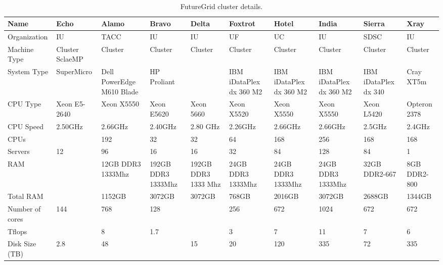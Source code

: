 
\begin{sidewaystable}

\caption{FutureGrid cluster details.}\label{F:cluster-details}
~\\
\begin{footnotesize}
\begin{tabular}{|p{2cm}||p{4cm}p{1.5cm}p{1.5cm}p{1.5cm}p{1.5cm}p{1.5cm}p{1.5cm}p{1.5cm}p{1cm}|}
\hline
 \bf Name                                & \bf Echo & \bf Alamo & \bf Bravo & \bf Delta & \bf Foxtrot & \bf Hotel & \bf India & \bf Sierra & \bf Xray \\
\hline
\hline
 Organization                        & IU & TACC & IU & IU & UF & UC & IU & SDSC & IU \\
\hline
 Machine Type                        & Cluster SclaeMP & Cluster & Cluster & Cluster & Cluster & Cluster & Cluster & Cluster & Cluster \\
\hline
 System Type                         &SuperMicro& Dell PowerEdge M610 Blade & HP Proliant && IBM iDataPlex dx 360 M2 & IBM iDataPlex dx 360 M2 & IBM iDataPlex dx 360 M2 & IBM iDataPlex dx 340 & Cray XT5m \\
\hline
 CPU Type                            & Xeon E5-2640 &  Xeon X5550 &  Xeon E5620 &  Xeon 5660 &  Xeon X5520 &  Xeon X5550 &  Xeon X5550 &  Xeon L5420 & Opteron 2378 \\
\hline
 CPU Speed                           &2.50GHz& 2.66GHz & 2.40GHz & 2.80 GHz & 2.26GHz & 2.66GHz & 2.66GHz & 2.5GHz & 2.4GHz \\
\hline
 CPUs                                &&192&32&32&64&168&256&168&168 \\
\hline
 Servers                             &12&96&16&16&32&84&128&84&1 \\
\hline
 RAM                                 && 12GB DDR3 1333Mhz & 192GB DDR3 1333Mhz & 192GB DDR3 1333 Mhz & 24GB DDR3 1333Mhz & 24GB DDR3 1333Mhz & 24GB DDR3 1333Mhz & 32GB DDR2-667 & 8GB DDR2-800 \\
\hline
 Total RAM                           &&1152GB&3072GB&3072GB&768GB&2016GB&3072GB&2688GB&1344GB \\
\hline
 Number of cores                     &144&768&128&&256&672&1024&672&672 \\
\hline
 Tflops                              &&8&1.7&&3&7&11&7&6 \\
\hline
 Disk Size (TB)                      &2.8&48&&15&20&120&335&72&335 \\

\end{tabular}
\end{footnotesize}
\end{sidewaystable}
